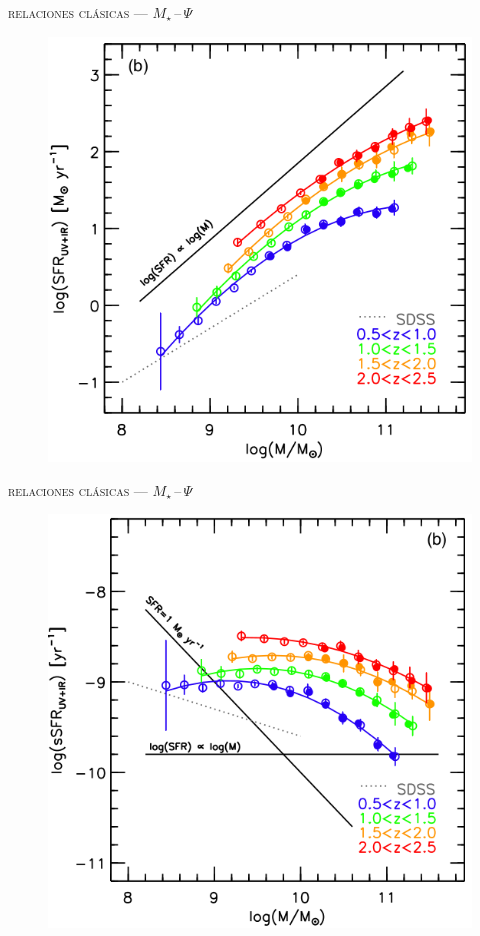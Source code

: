\documentclass[xcolor=dvipsnames,4pt,hyperref={colorlinks,citecolor=black,linkcolor=black,urlcolor=black}]{beamer}
\begin{document}
\begin{frame}{\textsc{relaciones clásicas --- $M_\star\,$--$\,\Psi$}}

\begin{figure}
\includegraphics[scale=1]{img/whitaker2014-1}
\end{figure}
\end{frame}

\begin{frame}{\textsc{relaciones clásicas --- $M_\star\,$--$\,\Psi$}}

\begin{figure}
\includegraphics[scale=1]{img/whitaker2014-2}
\end{figure}
\end{frame}
\end{document}
